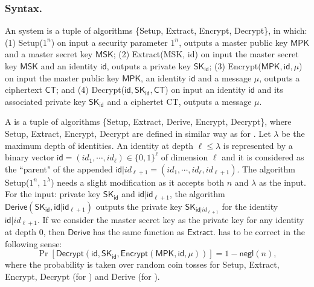 \documentclass[runningheads]{llncs}
\begin{document}
\subsubsection{Syntax.} 
An  system \cite{Sha85} is a tuple of algorithms \{\textsf{Setup}, \textsf{Extract}, \textsf{Encrypt}, \textsf{Decrypt}\}, in which: (1)
\textsf{Setup}($1^n$) on input a security parameter $1^n$,
		outputs a master public key $\textsf{MPK}$ and a master secret key $\textsf{MSK}$; (2) 
\textsf{Extract}(\textsf{MSK}, \textsf{id})  on input the master secret key $\textsf{MSK}$
		 and an identity $\textsf{id}$, 
		 outputs a private key $\textsf{SK}_{\textsf{id}}$; (3) 
	\textsf{Encrypt}($\textsf{MPK},\textsf{id}, \mu$) on input the master public key 
		$\textsf{MPK}$, an identity $\textsf{id}$ and a message $\mu$, outputs a ciphertext $\textsf{CT}$; and (4)
	\textsf{Decrypt}($\textsf{id}, \textsf{SK}_\textsf{id}, \textsf{CT}$)
		on input an identity $\textsf{id}$ and its associated private key 
		$\textsf{SK}_\textsf{id}$ and a ciphertet \textsf{CT}, outputs a message $\mu$.



A  \cite{GS02a} is a tuple of algorithms \{\textsf{Setup}, \textsf{Extract}, \textsf{Derive}, \textsf{Encrypt}, \textsf{Decrypt}\}, 
where \textsf{Setup}, \textsf{Extract}, \textsf{Encrypt}, \textsf{Decrypt}
are defined in similar way as for . 
Let $\lambda$ be the maximum depth of identities. 
An identity at depth $\ell \leq \lambda$ is represented by a binary vector $\textsf{id}=(id_{1}, \cdots, id_{\ell}) \in \{0, 1\}^\ell$ of dimension $\ell$ and it is considered as the ``parent" of the appended $\textsf{id}|id_{\ell+1}=(id_1, \cdots, id_{\ell}, id_{\ell+1})$. 
The algorithm \textsf{Setup}($1^n$, $1^\lambda$) needs a slight modification as
it accepts both $n$ and $\lambda$ as the input. 
For the input: private key $\textsf{SK}_\textsf{id}$ and  $\textsf{id}|\textsf{id}_{\ell+1}$,
the algorithm $\textsf{Derive}(\textsf{SK}_\textsf{id}, \textsf{id}|\textsf{id}_{\ell+1})$
outputs the private key $\textsf{SK}_{\textsf{id}|id_{\ell+1}}$ for the identity $\textsf{id}|id_{\ell+1}$.
If we consider the master secret key as the private key for any identity at depth $0$,  
then $\textsf{Derive}$ has the same function as  $\textsf{Extract}$.
 has to be correct in the following sense:
$$\Pr[\textsf{Decrypt}(\textsf{id}, \textsf{SK}_{\textsf{id}}, \textsf{Encrypt}(\textsf{MPK},\textsf{id}, \mu))]=1-\textsf{negl}(n),$$
where the probability is taken over random coin tosses for \textsf{Setup}, \textsf{Extract}, \textsf{Encrypt}, \textsf{Decrypt} (for ) and \textsf{Derive} (for ).  
\end{document}
